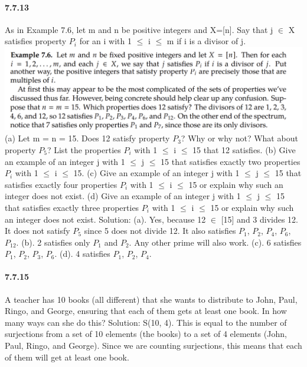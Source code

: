 \documentclass{article}
\begin{document}
\paragraph{7.7.13}
As in Example 7.6, let m and n be positive integers and X=[n]. Say that j $\in$ X
satisfies property $P_i$ for an i with 1 $\leq$ i $\leq$ m if i is a divisor of j.\newline
\includegraphics{Example7.6}\newline
(a) Let m = n = 15. Does 12 satisfy property $P_3$? Why or why not? What about
property $P_5$? List the properties $P_i$ with 1 $\leq$ i $\leq$ 15 that 12 satisfies.\newline
(b) Give an example of an integer j with 1 $\leq$ j $\leq$ 15 that satisfies exactly two properties $P_i$ with 1 $\leq$ i $\leq$ 15.\newline
(c) Give an example of an integer j with 1 $\leq$ j $\leq$ 15 that satisfies exactly four properties $P_i$ with 1 $\leq$ i $\leq$ 15 or explain why such an integer does not exist.\newline
(d) Give an example of an integer j with 1 $\leq$ j $\leq$ 15 that satisfies exactly three properties $P_i$ with 1 $\leq$ i $\leq$ 15 or explain why such an integer does not exist.\newline
Solution:\newline
(a). Yes, because 12 $\in$ [15] and 3 divides 12. It does not satisfy $P_5$ since 5 does not divide
12. It also satisfies $P_1$, $P_2$, $P_4$, $P_6$, $P_{12}$.\newline
(b). 2 satisfies only $P_1$ and $P_2$. Any other prime will also work.\newline
(c). 6 satisfies $P_1$, $P_2$, $P_3$, $P_6$.\newline
(d). 4 satisfies $P_1$, $P_2$, $P_4$.
\paragraph{7.7.15}
A teacher has 10 books (all different) that she wants to distribute to John, Paul,
Ringo, and George, ensuring that each of them gets at least one book. In how many
ways can she do this?\newline
Solution:\newline
S(10, 4). This is equal to the number of surjections from a set of 10 elements (the books) to
a set of 4 elements (John, Paul, Ringo, and George). Since we are counting surjections, this
means that each of them will get at least one book.
\end{document}
